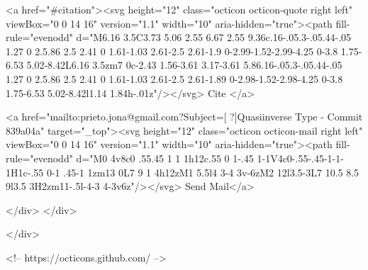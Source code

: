       <a  href="#citation"><svg height="12" class="octicon octicon-quote right left" viewBox="0 0 14 16" version="1.1" width="10" aria-hidden="true"><path fill-rule="evenodd" d="M6.16 3.5C3.73 5.06 2.55 6.67 2.55 9.36c.16-.05.3-.05.44-.05 1.27 0 2.5.86 2.5 2.41 0 1.61-1.03 2.61-2.5 2.61-1.9 0-2.99-1.52-2.99-4.25 0-3.8 1.75-6.53 5.02-8.42L6.16 3.5zm7 0c-2.43 1.56-3.61 3.17-3.61 5.86.16-.05.3-.05.44-.05 1.27 0 2.5.86 2.5 2.41 0 1.61-1.03 2.61-2.5 2.61-1.89 0-2.98-1.52-2.98-4.25 0-3.8 1.75-6.53 5.02-8.42l1.14 1.84h-.01z"/></svg> Cite
      </a>

      <a href="mailto:prieto.jona@gmail.com?Subject=[ ?]Quasiinverse Type - Commit 839a04a" target="_top"><svg height="12" class="octicon octicon-mail right left" viewBox="0 0 14 16" version="1.1" width="10" aria-hidden="true"><path fill-rule="evenodd" d="M0 4v8c0 .55.45 1 1 1h12c.55 0 1-.45 1-1V4c0-.55-.45-1-1-1H1c-.55 0-1 .45-1 1zm13 0L7 9 1 4h12zM1 5.5l4 3-4 3v-6zM2 12l3.5-3L7 10.5 8.5 9l3.5 3H2zm11-.5l-4-3 4-3v6z"/></svg> Send Mail</a>

    </div>
  </div>

</div>

<!-- https://octicons.github.com/ -->





